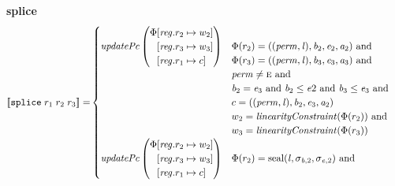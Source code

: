 \documentclass[a4paper]{article}
\newcommand{\sem}[1]{\left\llbracket #1 \right\rrbracket}
\newcommand{\tand}{\text{ and }}
\newcommand{\targetcolor}[1]{\color{black}}
\newcommand{\trg}[1]{{\targetcolor{} #1}}
\newcommand{\zinstr}[1]{\texttt{#1}}
\newcommand{\threeinstr}[4]{
  \ifthenelse{\equal{#2#3#4}{}}
  {\zinstr{#1}}
  {\zinstr{#1} \; #2 \; #3 \; #4}
}
\newcommand{\tsplice}[3]{\threeinstr{\trg{splice}}{#1}{#2}{#3}}
\newcommand{\update}[2]{[#1 \mapsto #2]}
\newcommand{\updReg}[2]{\update{\reg.#1}{#2}}
\newcommand{\shareddom}[1]{\mathrm{#1}}
\newcommand{\perm}{\var{perm}}
\newcommand{\lin}{\var{l}}
\newcommand{\seal}[1]{\shareddom{seal}(#1)}
\newcommand{\var}[1]{\mathit{#1}}
\newcommand{\reg}{\var{reg}}
\newcommand{\baddr}{\var{b}}
\newcommand{\eaddr}{\var{e}}
\newcommand{\aaddr}{\var{a}}
\newcommand{\plainperm}[1]{\textsc{#1}}
\newcommand{\enter}{\plainperm{e}}
\newcommand{\plainfun}[2]{
  \ifthenelse{\equal{#2}{}}
  {\mathit{#1}}
  {\mathit{#1}(#2)}
}
\newcommand{\updPcAddr}[1]{\plainfun{updatePc}{#1}}
\newcommand{\linCons}[1]{\plainfun{linearityConstraint}{#1}}
\begin{document}
\noindent\textbf{splice}\\
\begin{align*}
  \sem{\tsplice{r_1}{r_2}{r_3}} = &
                              \begin{cases}
                                \updPcAddr{}\left(
                                \arraycolsep=0pt
                                \begin{array}{r l}
                                  \Phi&\updReg{r_2}{w_2}\\
                                      &\updReg{r_3}{w_3}\\
                                      &\updReg{r_1}{c}
                                \end{array}\right)
&
                                \arraycolsep=0pt
                                \begin{array}[t]{l}
                                  \Phi(r_2) = ((\perm,\lin),\baddr_2,\eaddr_2,\aaddr_2) \tand \\
                                  \Phi(r_3) = ((\perm,\lin),\baddr_3,\eaddr_3,\aaddr_3) \tand \\
                                  \perm \neq \enter \tand \\
                                  \baddr_2 = \eaddr_3 \tand \baddr_2 \leq \eaddr2 \tand \baddr_3 \leq \eaddr_3 \tand \\
                                  c = ((\perm,\lin),\baddr_2,\eaddr_3,\aaddr_2) \\
                                  w_2 = \linCons{\Phi(r_2)} \tand \\
                                  w_3 = \linCons{\Phi(r_3)} \\
                                \end{array}\\
                                \updPcAddr{}\left(
                                \arraycolsep=0pt
                                \begin{array}{r l}
                                  \Phi&\updReg{r_2}{w_2}\\
                                      &\updReg{r_3}{w_3}\\
                                      &\updReg{r_1}{c}
                                \end{array}\right)
&
                                \arraycolsep=0pt
                                \begin{array}[t]{l}
                                  \Phi(r_2) = \seal{\lin,\sigma_{\baddr,2},\sigma_{\eaddr,2}} \tand \\

\end{array}
\end{cases}
\end{align*}
\end{document}
